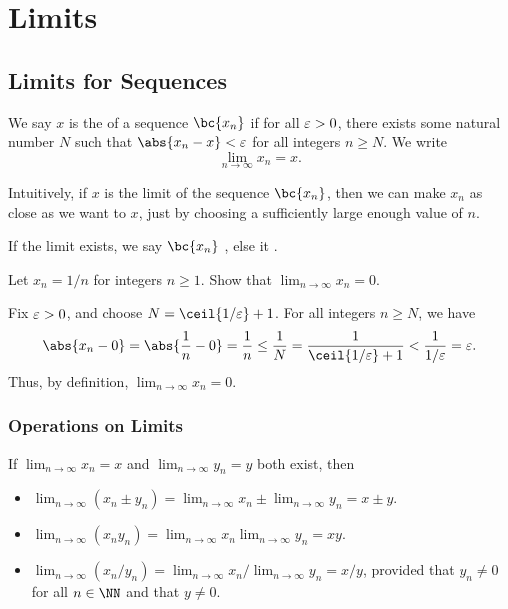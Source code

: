 \chapter{Limits}

\section{Limits for Sequences}

\begin{definition}
    We say $x$ is the  of a sequence $\bc{x_n}$ if for all $\varepsilon > 0$, there exists some natural number $N$ such that $\abs{x_n - x} < \ve$ for all integers $n \geq N$. We write \[\lim_{n \to \infty} x_n = x.\]
\end{definition}

Intuitively, if $x$ is the limit of the sequence $\bc{x_n}$, then we can make $x_n$ as close as we want to $x$, just by choosing a sufficiently large enough value of $n$.

If the limit exists, we say $\bc{x_n}$ , else it .

\begin{sample}
    Let $x_n = 1/n$ for integers $n \geq 1$. Show that $\lim_{n \to \infty} x_n = 0$.
\end{sample}
\begin{sampans}
    Fix $\varepsilon > 0$, and choose $N = \ceil{1/\ve} + 1$. For all integers $n \geq N$, we have \[\abs{x_n - 0} = \abs{\frac1n - 0} = \frac1n \leq \frac1{N} = \frac1{\ceil{1/\ve} + 1} < \frac1{1/\ve} = \ve.\] Thus, by definition, $\lim_{n \to \infty} x_n = 0$.
\end{sampans}

\subsection{Operations on Limits}

\begin{fact}
    If $\displaystyle\lim_{n \to \infty} x_n = x$ and $\displaystyle\lim_{n \to \infty} y_n = y$ both exist, then
    \begin{itemize}
        \item $\displaystyle\lim_{n \to \infty} (x_n \pm y_n) = \lim_{n \to \infty} x_n \pm \lim_{n \to \infty} y_n = x \pm y$.
        \item $\displaystyle\lim_{n \to \infty} (x_n y_n) = \lim_{n \to \infty} x_n \lim_{n \to \infty} y_n = xy$.
        \item $\displaystyle\lim_{n \to \infty} (x_n/y_n) = \lim_{n \to \infty} x_n / \lim_{n \to \infty} y_n = x/y$, provided that $y_n \neq 0$ for all $n \in \NN$ and that $y \neq 0$.
    \end{itemize}
\end{fact}

